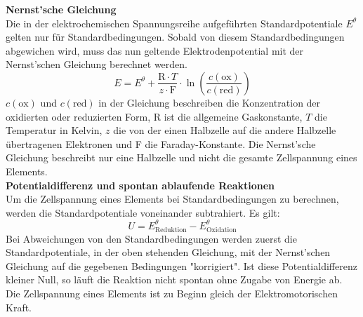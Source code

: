 \noindent\textbf{Nernst'sche Gleichung}\\
Die in der elektrochemischen Spannungsreihe aufgeführten Standardpotentiale $E^\theta$
gelten nur für Standardbedingungen. Sobald von diesem Standardbedingungen abgewichen wird, muss das nun geltende Elektrodenpotential mit der Nernst’schen
Gleichung berechnet werden.
\begin{equation}
    E=E^\theta + \frac{\mathrm{R}\cdot T}{z\cdot \mathrm{F}}\cdot \ln \left(\frac{c(\mathrm{ox})}{c(\mathrm{red})}\right)
\end{equation}
$c(\mathrm{ox})$ und $c(\mathrm{red})$ in der Gleichung beschreiben die Konzentration der oxidierten
oder reduzierten Form, R ist die allgemeine Gaskonstante, $T$ die Temperatur in Kelvin, $z$ die von der einen Halbzelle auf die andere Halbzelle
übertragenen Elektronen und F die Faraday-Konstante. Die Nernst’sche Gleichung beschreibt nur eine Halbzelle und nicht die gesamte
Zellspannung eines Elements.\supercite{skript}\\

\noindent\textbf{Potentialdifferenz und spontan ablaufende Reaktionen}\\
Um die Zellspannung eines Elements bei Standardbedingungen zu berechnen, werden die Standardpotentiale voneinander subtrahiert. Es gilt:
\begin{equation}
    U=E^\theta_\mathrm{Reduktion}-E^\theta_\mathrm{Oxidation}
\end{equation}
Bei Abweichungen von den Standardbedingungen werden zuerst die Standardpotentiale, in der oben stehenden Gleichung, mit der Nernst’schen Gleichung auf die
gegebenen Bedingungen "korrigiert". Ist diese Potentialdifferenz kleiner Null, so
läuft die Reaktion nicht spontan ohne Zugabe von Energie ab. Die Zellspannung
eines Elements ist zu Beginn gleich der Elektromotorischen Kraft.\supercite{skript}